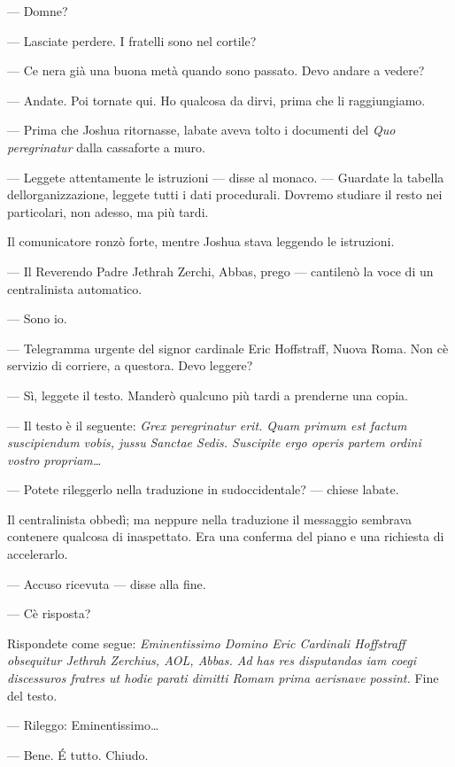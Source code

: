 --- Domne?

--- Lasciate perdere. I fratelli sono nel cortile?

--- Ce n\textquotesingle era già una buona metà quando sono passato.
Devo andare a vedere?

--- Andate. Poi tornate qui. Ho qualcosa da dirvi, prima che li
raggiungiamo.

--- Prima che Joshua ritornasse, l\textquotesingle abate aveva tolto i
documenti del \emph{Quo peregrinatur} dalla cassaforte a muro.

--- Leggete attentamente le istruzioni --- disse al monaco. --- Guardate
la tabella dell\textquotesingle organizzazione, leggete tutti i dati
procedurali. Dovremo studiare il resto nei particolari, non adesso, ma
più tardi.

Il comunicatore ronzò forte, mentre Joshua stava leggendo le istruzioni.

--- Il Reverendo Padre Jethrah Zerchi, Abbas, prego --- cantilenò la
voce di un centralinista automatico.

--- Sono io.

--- Telegramma urgente del signor cardinale Eric Hoffstraff, Nuova Roma.
Non c\textquotesingle è servizio di corriere, a
quest\textquotesingle ora. Devo leggere?

--- Sì, leggete il testo. Manderò qualcuno più tardi a prenderne una
copia.

--- Il testo è il seguente: \emph{Grex peregrinatur erit. Quam primum
	est factum suscipiendum vobis, jussu} \emph{Sanctae Sedis. Suscipite
	ergo operis partem ordini vostro propriam\ldots{}}

--- Potete rileggerlo nella traduzione in sudoccidentale? --- chiese
l\textquotesingle abate.

Il centralinista obbedì; ma neppure nella traduzione il messaggio
sembrava contenere qualcosa di inaspettato. Era una conferma del piano e
una richiesta di accelerarlo.

--- Accuso ricevuta --- disse alla fine.

--- C\textquotesingle è risposta?

Rispondete come segue: \emph{Eminentissimo Domino Eric Cardinali
	Hoffstraff obsequitur Jethrah Zerchius, AOL, Abbas. Ad has res
	disputandas iam coegi discessuros fratres ut hodie parati dimitti Romam
	prima aerisnave possint.} Fine del testo.

--- Rileggo: Eminentissimo\ldots{}

--- Bene. É tutto. Chiudo.


